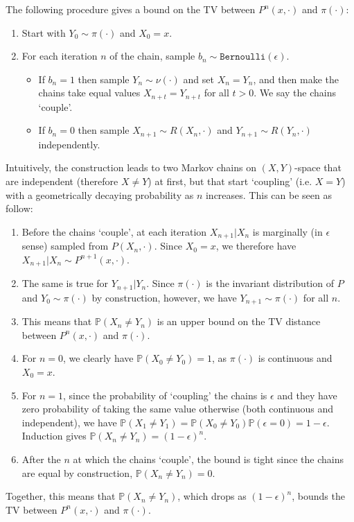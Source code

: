 \documentclass{article}
\begin{document}
  The following procedure gives a bound on the TV between $P^n(x,\cdot)$ and $\pi(\cdot)$:
\begin{enumerate}
\item Start with $Y_0 \sim \pi(\cdot)$ and $X_0 = x$.
\item For each iteration $n$ of the chain, sample $b_n \sim \texttt{Bernoulli}(\epsilon)$. 
\begin{itemize}
\item If $b_n = 1$ then sample $Y_n \sim \nu(\cdot)$ and set $X_n = Y_n$, and then make the chains take equal values $X_{n+t}=Y_{n+t}$ for all $t>0$. We say the chains  `couple'.
\item If $b_n = 0$ then sample $X_{n+1} \sim R(X_n,\cdot)$ and $Y_{n+1} \sim R(Y_{n},\cdot)$ independently.
\end{itemize}
\end{enumerate}
Intuitively, the construction leads to two Markov chains on $(X,Y)$-space that are independent (therefore $X\neq Y$) at first, but that start `coupling' (i.e. $X=Y$) with a geometrically decaying probability as $n$ increases. This can be seen as follow:
\begin{enumerate}
\item Before the chains `couple', at each iteration $X_{n+1}|X_n$ is marginally (in $\epsilon$ sense) sampled from $P(X_n,\cdot)$. Since $X_0=x$, we therefore have $X_{n+1}|X_n \sim P^{n+1}(x,\cdot)$.
\item The same is true for $Y_{n+1}|Y_n$. Since $\pi(\cdot)$ is the invariant distribution  of $P$ and $Y_0\sim\pi(\cdot)$ by construction, however, we have $Y_{n+1} \sim \pi(\cdot)$ for all $n$.
\item This means that $\mathbb{P}(X_n \neq Y_n)$ is an upper bound on the TV distance between $P^{n}(x,\cdot)$ and $\pi(\cdot)$.
\item For $n=0$, we clearly have $\mathbb{P}(X_0 \neq Y_0)=1$, as $\pi(\cdot)$ is continuous and $X_0 = x$.
\item For $n=1$, since the probability of `coupling' the chains is $\epsilon$ and they have zero probability of taking the same value otherwise (both continuous and independent), we have $\mathbb{P}(X_1 \neq Y_1)=\mathbb{P}(X_0 \neq Y_0)\mathbb{P}(\epsilon=0)=1-\epsilon$.  Induction gives $\mathbb{P}(X_n \neq Y_n) = (1-\epsilon)^n$. 
\item After the $n$ at which the chains `couple', the bound is tight since the chains are equal by construction, $\mathbb{P}(X_n \neq Y_n)=0$.
\end{enumerate}
Together, this means that $\mathbb{P}(X_n \neq Y_n)$, which drops as $(1-\epsilon)^n$, bounds the TV between $P^{n}(x,\cdot)$ and $\pi(\cdot)$. 
\end{document}
